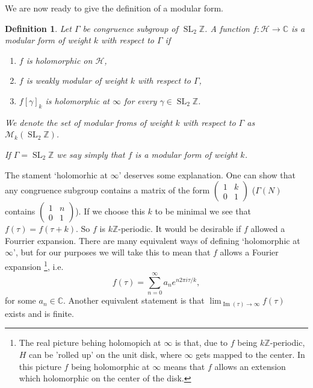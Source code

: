 \documentclass[a4paper]{article}
\theoremstyle{theoremdd}
\theoremstyle{definitiondd}
\newtheorem{definition}[theorem]{Definition}
\theoremstyle{remarkdd}
\newcommand{\Z}{\mathbb{Z}}
\newcommand{\C}{\mathbb{C}}
\DeclareMathOperator{\im}{Im}
\DeclareMathOperator{\SL}{SL}
\begin{document}
We are now ready to give the definition of a modular form. 
\begin{definition}\label{def:modular_form}
	Let $\Gamma$ be congruence subgroup of $\SL_2\Z$.
	A function $f: \mathcal{H}  \to \C$ is a \emph{modular form of weight $ k$ with respect to $\Gamma$} if 
	\begin{enumerate}
		\item $f$ is holomorphic on $\mathcal{H} $,
		\item $f$ is weakly modular of weight $k$ with respect to $\Gamma$, 
		\item $f[\gamma]_k$ is holomorphic at $\infty$ for every $\gamma \in \SL_2\Z$. 
	\end{enumerate}
	We denote the set of modular froms of weight $k$ with respect to $\Gamma$ as $\mathcal{M} _k(\SL_2\Z)$. 
	
	If $\Gamma = \SL_2\Z$ we say simply that $f$ is a modular form of weight $k$. 
\end{definition}
The stament `holomorhic at $\infty$' deserves some explanation. 
One can show that any congruence subgroup contains a matrix of the form $\begin{pmatrix} 1 & k \\ 0 & 1 \end{pmatrix} $ ($\Gamma(N)$ contains  $\begin{pmatrix} 1 & n \\ 0 & 1 \end{pmatrix} $). 
If we choose this $k$ to be minimal we see that $f(\tau) = f(\tau + k)$. 
So $f$ is $k\Z$-periodic. It would be desirable if $f$ allowed a Fourrier expansion.  
There are many equivalent ways of defining `holomorphic at $\infty$', but for our purposes we will take this to mean that $f$ allows a Fourier expansion \footnote{The real picture behing holomopich at $\infty$ is that, due to $f$ being $k\Z$-periodic, $H$ can be 'rolled up' on the unit disk, where $\infty$ gets mapped to the center. In this picture  $f$ being holomorphic at $\infty$ means that  $f$ allows an extension which holomorphic on the center of the disk.}, i.e.\ \[
	f(\tau) = \sum_{n=0}^{\infty} a_n e^{n 2\pi i \tau / k}
,\]
for some $a_n \in \C$.
Another equivalent statement is that $\lim_{\im(\tau) \to \infty} f(\tau)$ exists and is finite.
\end{document}
